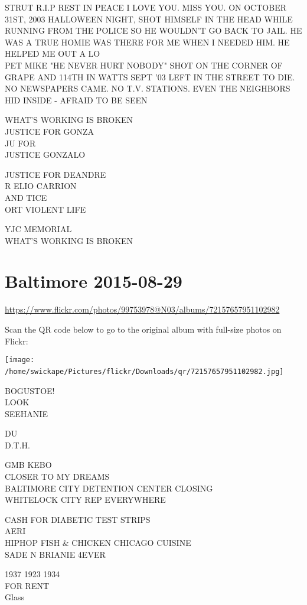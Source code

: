 \documentclass[10pt,letterpaper]{article}
\begin{document}
STRUT R.I.P REST IN PEACE I LOVE YOU.  MISS YOU.  ON OCTOBER 31ST, 2003 HALLOWEEN NIGHT, SHOT HIMSELF IN THE HEAD WHILE RUNNING FROM THE POLICE SO HE WOULDN'T GO BACK TO JAIL.  HE WAS A TRUE HOMIE WAS THERE FOR ME WHEN I NEEDED HIM.  HE HELPED ME OUT A LO\\
PET MIKE "HE NEVER HURT NOBODY" SHOT ON THE CORNER OF GRAPE AND 114TH IN WATTS SEPT '03 LEFT IN THE STREET TO DIE.  NO NEWSPAPERS CAME.  NO T.V. STATIONS.  EVEN THE NEIGHBORS HID INSIDE {-} AFRAID TO BE SEEN

WHAT'S WORKING IS BROKEN\\
JUSTICE FOR GONZA\\
JU FOR\\
JUSTICE GONZALO

JUSTICE FOR DEANDRE\\
R ELIO CARRION\\
AND TICE\\
ORT VIOLENT LIFE

YJC MEMORIAL\\
WHAT'S WORKING IS BROKEN
\

\section*{Baltimore 2015-08-29}

\url{https://www.flickr.com/photos/99753978@N03/albums/72157657951102982}

Scan the QR code below to go to the original album with full-size photos on Flickr:

\texttt{[image: /home/swickape/Pictures/flickr/Downloads/qr/72157657951102982.jpg]}
\

BOGUSTOE!\\
LOOK\\
SEEHANIE

DU\\
D.T.H.

GMB KEBO\\
CLOSER TO MY DREAMS\\
BALTIMORE CITY DETENTION CENTER CLOSING\\
WHITELOCK CITY REP EVERYWHERE

CASH FOR DIABETIC TEST STRIPS\\
AERI\\
HIPHOP FISH \& CHICKEN CHICAGO CUISINE\\
SADE N BRIANIE 4EVER

1937 1923 1934\\
FOR RENT\\
Glass
\end{document}
